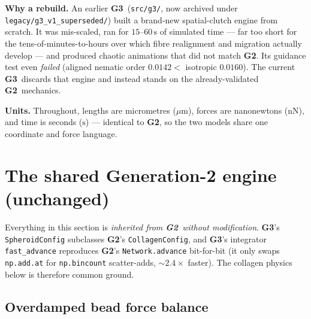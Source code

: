 \documentclass[11pt]{article}
\newcommand{\umt}{\mu\text{m}}            %
\newcommand{\GTwo}{\textcolor{g2col}{\textbf{G2}}}
\newcommand{\GThree}{\textcolor{g3col}{\textbf{G3}}}
\newcommand{\code}[1]{\texttt{\small #1}}
\begin{document}
\noindent\textbf{Why a rebuild.} An earlier \GThree\ (\code{src/g3/}, now archived under
\code{legacy/g3\_v1\_superseded/}) built a brand-new spatial-clutch engine from scratch. It was
mis-scaled, ran for $15$--$60\,\text{s}$ of simulated time --- far too short for the
tens-of-minutes-to-hours over which fibre realignment and migration actually develop --- and
produced chaotic animations that did not match \GTwo. Its guidance test even \emph{failed}
(aligned nematic order $0.0142 <$ isotropic $0.0160$). The current \GThree\ discards that engine and
instead stands on the already-validated \GTwo\ mechanics.

\medskip
\noindent\textbf{Units.} Throughout, lengths are micrometres ($\umt$), forces are
nanonewtons ($\text{nN}$), and time is seconds ($\text{s}$) --- identical to \GTwo, so the two
models share one coordinate and force language.

\section{The shared Generation-2 engine (unchanged)}
\label{sec:engine}

Everything in this section is \emph{inherited from \GTwo\ without modification}. \GThree's
\code{SpheroidConfig} subclasses \GTwo's \code{CollagenConfig}, and \GThree's integrator
\code{fast\_advance} reproduces \GTwo's \code{Network.advance} bit-for-bit (it only swaps
\code{np.add.at} for \code{np.bincount} scatter-adds, $\sim\!2.4\times$ faster). The collagen
physics below is therefore common ground.

\subsection{Overdamped bead force balance}
\end{document}
